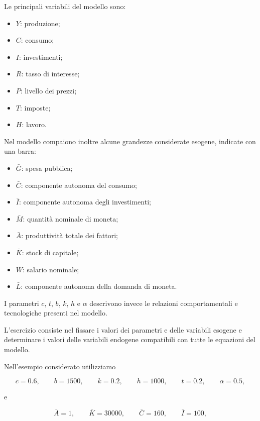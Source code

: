 Le principali variabili del modello sono:

\begin{itemize}
    \item $Y$: produzione;
    \item $C$: consumo;
    \item $I$: investimenti;
    \item $R$: tasso di interesse;
    \item $P$: livello dei prezzi;
    \item $T$: imposte;
    \item $H$: lavoro.
\end{itemize}

Nel modello compaiono inoltre alcune grandezze considerate esogene,
indicate con una barra:

\begin{itemize}
    \item $\bar{G}$: spesa pubblica;
    \item $\bar{C}$: componente autonoma del consumo;
    \item $\bar{I}$: componente autonoma degli investimenti;
    \item $\bar{M}$: quantità nominale di moneta;
    \item $\bar{A}$: produttività totale dei fattori;
    \item $\bar{K}$: stock di capitale;
    \item $\bar{W}$: salario nominale;
    \item $\bar{L}$: componente autonoma della domanda di moneta.
\end{itemize}

I parametri $c$, $t$, $b$, $k$, $h$ e $\alpha$ descrivono invece
le relazioni comportamentali e tecnologiche presenti nel modello.

L'esercizio consiste nel fissare i valori dei parametri e delle
variabili esogene e determinare i valori delle variabili endogene
compatibili con tutte le equazioni del modello.

Nell'esempio considerato utilizziamo

\begin{equation*}
c=0.6,\qquad
b=1500,\qquad
k=0.2,\qquad
h=1000,\qquad
t=0.2,\qquad
\alpha=0.5,
\end{equation*}

e

\begin{equation*}
\bar{A}=1,\qquad
\bar{K}=30000,\qquad
\bar{C}=160,\qquad
\bar{I}=100,
\end{equation*}


